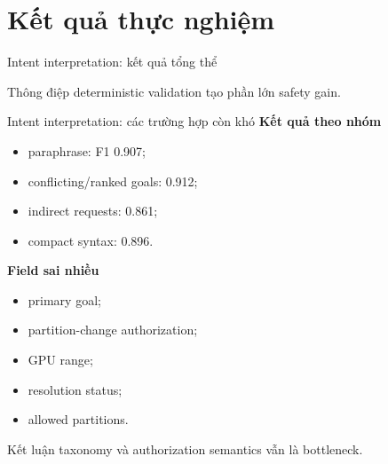 \section{Kết quả thực nghiệm}

\begin{frame}[t,shrink=20]{Intent interpretation: kết quả tổng thể}
\scriptsize
\begin{center}
\scriptsize
\renewcommand{\arraystretch}{1.16}
\end{center}
\begin{alertblock}{Thông điệp}
deterministic validation tạo phần lớn safety gain.
\end{alertblock}
\end{frame}

\begin{frame}[t,shrink=20]{Intent interpretation: các trường hợp còn khó}
\scriptsize
\vspace{0.15em}
\textbf{Kết quả theo nhóm}\par
\begin{itemize}
\item paraphrase: F1 0.907;
\item conflicting/ranked goals: 0.912;
\item indirect requests: 0.861;
\item compact syntax: 0.896.
\end{itemize}
\vspace{0.15em}
\textbf{Field sai nhiều}\par
\begin{itemize}
\item primary goal;
\item partition-change authorization;
\item GPU range;
\item resolution status;
\item allowed partitions.
\end{itemize}
\begin{alertblock}{Kết luận}
taxonomy và authorization semantics vẫn là bottleneck.
\end{alertblock}
\end{frame}

